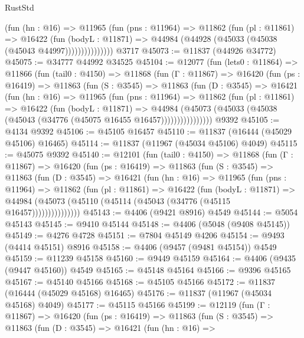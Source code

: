 \begin{lexlean}{RustStd}
\begin{coremodule}
                  (fun (hn : @16) =>
                  @11965
                    (fun (pns : @11964) =>
                    @11862
                      (fun (pl : @11861) =>
                      @16422
                        (fun (bodyL : @11871) =>
                        @44984 (@44928 (@45033 (@45038 (@45043 @44997)))))))))))))))
    @3717
@45073 := @11837 (@44926 @34772)
@45075 := @34777 @44992 @34525
@45104 := @12077
    (fun (lets0 : @11864) =>
    @11866
      (fun (tail0 : @4150) =>
      @11868
        (fun (Γ : @11867) =>
        @16420
          (fun (ps : @16419) =>
          @11863
            (fun (S : @3545) =>
            @11863
              (fun (D : @3545) =>
              @16421
                (fun (hn : @16) =>
                @11965
                  (fun (pns : @11964) =>
                  @11862
                    (fun (pl : @11861) =>
                    @16422
                      (fun (bodyL : @11871) =>
                      @44984
                        (@45073
                          (@45033 (@45038 (@45043 (@34776 (@45075 @16455 @16457))))))))))))))))
    @9392
@45105 := @4134 @9392
@45106 := @45105 @16457
@45110 := @11837 (@16444 (@45029 @45106) @16465)
@45114 := @11837 (@11967 (@45034 @45106) @4049)
@45115 := @45075 @9392
@45140 := @12101
    (fun (tail0 : @4150) =>
    @11868
      (fun (Γ : @11867) =>
      @16420
        (fun (ps : @16419) =>
        @11863
          (fun (S : @3545) =>
          @11863
            (fun (D : @3545) =>
            @16421
              (fun (hn : @16) =>
              @11965
                (fun (pns : @11964) =>
                @11862
                  (fun (pl : @11861) =>
                  @16422
                    (fun (bodyL : @11871) =>
                    @44984 (@45073 (@45110 (@45114 (@45043 (@34776 (@45115 @16457)))))))))))))))
@45143 := @4406 (@9421 @8916) @4549
@45144 := @5054 @45143
@45145 := @9410 @45144
@45148 := @4406 (@5048 (@9408 @45145))
@45149 := @4276 @4728
@45151 := @7804 @45149 @4206
@45154 := @9493 (@4414 @45151) @8916
@45158 := @4406 (@9457 (@9481 @45154)) @4549
@45159 := @11239 @45158
@45160 := @9449 @45159
@45164 := @4406 (@9435 (@9447 @45160)) @4549
@45165 := @45148 @45164
@45166 := @9396 @45165
@45167 := @45140 @45166
@45168 := @45105 @45166
@45172 := @11837 (@16444 (@45029 @45168) @16465)
@45176 := @11837 (@11967 (@45034 @45168) @4049)
@45177 := @45115 @45166
@45199 := @12119
    (fun (Γ : @11867) =>
    @16420
      (fun (ps : @16419) =>
      @11863
        (fun (S : @3545) =>
        @11863
          (fun (D : @3545) =>
          @16421
            (fun (hn : @16) =>

\end{coremodule}
\end{lexlean}

